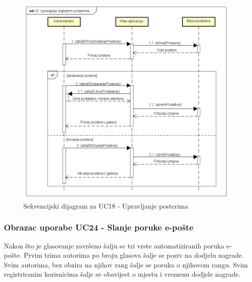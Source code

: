 				\newpage
				
				\begin{figure}[hp!]
					\includegraphics[width=\linewidth]{Slike/seqPostersRevised.png}
					\caption{Sekvencijski dijagram za UC18 - Upravljanje posterima}
				\end{figure}
				
				\newpage
				
				\subsubsection{Obrazac uporabe UC24 - Slanje poruke e-pošte}
				Nakon što je glasovanje završeno šalju se tri vrste automatiziranih poruka e-pošte. Prvim trima autorima po broju glasova šalje se poziv na dodjelu nagrade. Svim autorima, bez obzira na njihov rang šalje se poruka o njihovom rangu. Svim registriranim korisnicima šalje se obavijest o mjestu i vremenu dodjele nagrade.
				
